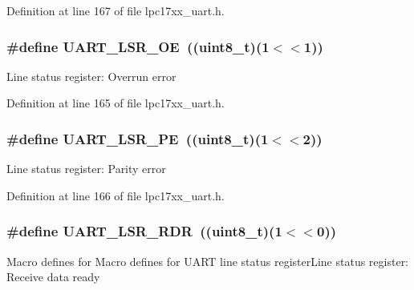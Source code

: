 Definition at line 167 of file lpc17xx\+\_\+uart.\+h.

\subsubsection[{\texorpdfstring{U\+A\+R\+T\+\_\+\+L\+S\+R\+\_\+\+OE}{UART_LSR_OE}}]{\setlength{\rightskip}{0pt plus 5cm}\#define U\+A\+R\+T\+\_\+\+L\+S\+R\+\_\+\+OE~(({\bf uint8\+\_\+t})(1$<$$<$1))}\hypertarget{group___u_a_r_t___private___macros_ga85c4312a700f6033bf0a075ae41de57c}{}\label{group___u_a_r_t___private___macros_ga85c4312a700f6033bf0a075ae41de57c}
Line status register\+: Overrun error 

Definition at line 165 of file lpc17xx\+\_\+uart.\+h.

\subsubsection[{\texorpdfstring{U\+A\+R\+T\+\_\+\+L\+S\+R\+\_\+\+PE}{UART_LSR_PE}}]{\setlength{\rightskip}{0pt plus 5cm}\#define U\+A\+R\+T\+\_\+\+L\+S\+R\+\_\+\+PE~(({\bf uint8\+\_\+t})(1$<$$<$2))}\hypertarget{group___u_a_r_t___private___macros_ga3ae0ee26be22b855aa08d68a2801d3d2}{}\label{group___u_a_r_t___private___macros_ga3ae0ee26be22b855aa08d68a2801d3d2}
Line status register\+: Parity error 

Definition at line 166 of file lpc17xx\+\_\+uart.\+h.

\subsubsection[{\texorpdfstring{U\+A\+R\+T\+\_\+\+L\+S\+R\+\_\+\+R\+DR}{UART_LSR_RDR}}]{\setlength{\rightskip}{0pt plus 5cm}\#define U\+A\+R\+T\+\_\+\+L\+S\+R\+\_\+\+R\+DR~(({\bf uint8\+\_\+t})(1$<$$<$0))}\hypertarget{group___u_a_r_t___private___macros_ga3d83de31d722cd373ee69a2a38aaed43}{}\label{group___u_a_r_t___private___macros_ga3d83de31d722cd373ee69a2a38aaed43}
Macro defines for Macro defines for U\+A\+RT line status register\+Line status register\+: Receive data ready 

